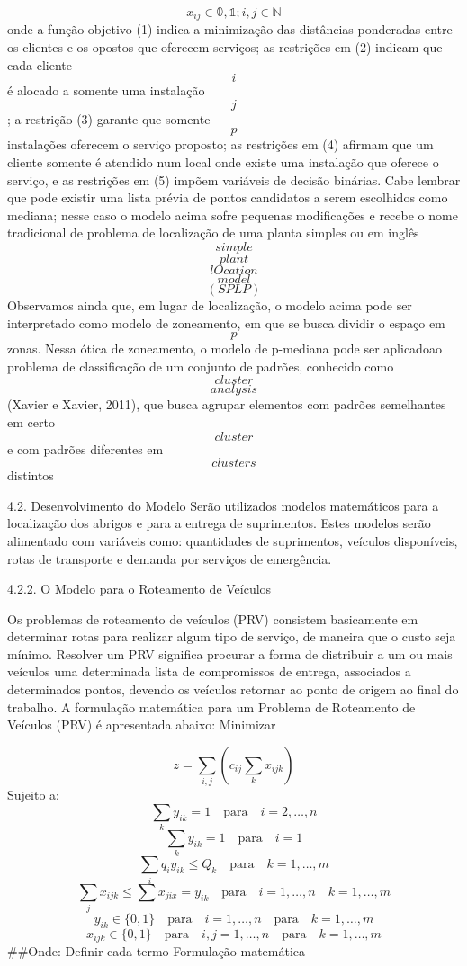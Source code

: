 \documentclass[
]{article}
\begin{document}
\[
x_{ij} \in \mathbb{0,1}; i,j \in \mathbb{N}
\] onde a função objetivo (1) indica a minimização das distâncias
ponderadas entre os clientes e os opostos que oferecem serviços; as
restrições em (2) indicam que cada cliente \[i\] é alocado a somente uma
instalação \[j\] ; a restrição (3) garante que somente \[
p
\] instalações oferecem o serviço proposto; as restrições em (4) afirmam
que um cliente somente é atendido num local onde existe uma instalação
que oferece o serviço, e as restrições em (5) impõem variáveis de
decisão binárias. Cabe lembrar que pode existir uma lista prévia de
pontos candidatos a serem escolhidos como mediana; nesse caso o modelo
acima sofre pequenas modificações e recebe o nome tradicional de
problema de localização de uma planta simples ou em inglês \[ simple \]
\[ plant \] \[ lOcation \] \[ model \] \[(SPLP)\] Observamos ainda que,
em lugar de localização, o modelo acima pode ser interpretado como
modelo de zoneamento, em que se busca dividir o espaço em \[
p\] zonas. Nessa ótica de zoneamento, o modelo de p-mediana pode ser
aplicadoao problema de classificação de um conjunto de padrões,
conhecido como \[cluster\] \[analysis\] (Xavier e Xavier, 2011), que
busca agrupar elementos com padrões semelhantes em certo \[ cluster \] e
com padrões diferentes em \[ clusters \] distintos

4.2. Desenvolvimento do Modelo Serão utilizados modelos matemáticos para
a localização dos abrigos e para a entrega de suprimentos. Estes modelos
serão alimentado com variáveis como: quantidades de suprimentos,
veículos disponíveis, rotas de transporte e demanda por serviços de
emergência.

4.2.2. O Modelo para o Roteamento de Veículos

Os problemas de roteamento de veículos (PRV) consistem basicamente em
determinar rotas para realizar algum tipo de serviço, de maneira que o
custo seja mínimo. Resolver um PRV significa procurar a forma de
distribuir a um ou mais veículos uma determinada lista de compromissos
de entrega, associados a determinados pontos, devendo os veículos
retornar ao ponto de origem ao final do trabalho. A formulação
matemática para um Problema de Roteamento de Veículos (PRV) é
apresentada abaixo: Minimizar

\[
z=\sum_{i,j}(c_{ij}\sum_{k}x_{ijk})
\] Sujeito a: \[
\sum_{k}y_{ik}=1 \quad \text{para} \quad  i=2, \dots,n
\] \[
\sum_{k}y_{ik}=1\quad \text{para} \quad  i=1
\] \[
\sum_{i}q_{i}y_{ik} \leq Q_{k} \quad \text{para} \quad  k=1, \dots,m
\] \[
\sum_{j}x_{ijk} \leq\sum x_{jix}=y_{ik} \quad \text{para}\quad i=1,\dots,n\quad k=1,\dots,m
\] \[
y_{ik} \in \{0,1\}\quad\text{para}\quad i=1,\dots,n\quad\text{para}\quad k=1,\dots,m
\] \[
x_{ijk} \in \{0,1\}\quad\text{para}\quad i,j=1,\dots,n\quad\text{para}\quad k=1,\dots,m
\] \#\#Onde: Definir cada termo Formulação matemática
\end{document}
